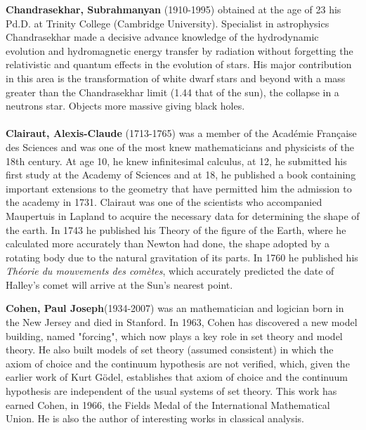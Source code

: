 \textbf{Chandrasekhar, Subrahmanyan} (1910-1995) obtained at the age of 23 his Pd.D. at Trinity College (Cambridge University). Specialist in astrophysics Chandrasekhar made a decisive advance knowledge of the hydrodynamic evolution and hydromagnetic energy transfer by radiation without forgetting the relativistic and quantum effects in the evolution of stars. His major contribution in this area is the transformation of white dwarf stars and beyond with a mass greater than the Chandrasekhar limit (1.44 that of the sun), the collapse in a neutrons star. Objects more massive giving black holes.\\\\

\textbf{Clairaut, Alexis-Claude} (1713-1765) was a member of the Académie Française des Sciences and was one of the most knew mathematicians and physicists of the 18th century. At age 10, he knew infinitesimal calculus, at 12, he submitted his first study at the Academy of Sciences and at 18, he published a book containing important extensions to the geometry that have permitted him the admission to the academy in 1731. Clairaut was one of the scientists who accompanied Maupertuis in Lapland to acquire the necessary data for determining the shape of the earth. In 1743 he published his Theory of the figure of the Earth, where he calculated more accurately than Newton had done, the shape adopted by a rotating body due to the natural gravitation of its parts. In 1760 he published his \textit{Théorie du mouvements des comètes}, which accurately predicted the date of Halley's comet will arrive at the Sun's nearest point.

\textbf{Cohen, Paul Joseph}(1934-2007) was an mathematician and logician born in the New Jersey and died in Stanford. In 1963, Cohen has discovered a new model building, named "forcing", which now plays a key role in set theory and model theory. He also built models of set theory (assumed consistent) in which the axiom of choice and the continuum hypothesis are not verified, which, given the earlier work of Kurt Gödel, establishes that axiom of choice and the continuum hypothesis are independent of the usual systems of set theory. This work has earned Cohen, in 1966, the Fields Medal of the International Mathematical Union. He is also the author of interesting works in classical analysis.

